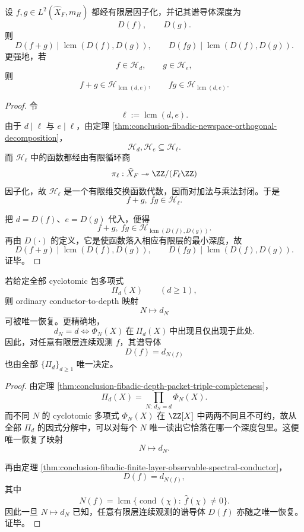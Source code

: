 \begin{theorem}\label{thm:conclusion-fibadic-finite-layer-lcm-filtration-law}
设 \(f,g\in L^2(\widehat X_F,m_H)\) 都经有限层因子化，并记其谱导体深度为
\[
D(f),\qquad D(g).
\]
则
\[
D(f+g)\mid \operatorname{lcm}(D(f),D(g)),
\qquad
D(fg)\mid \operatorname{lcm}(D(f),D(g)).
\]
更强地，若
\[
f\in \mathcal H_d,
\qquad
g\in \mathcal H_e,
\]
则
\[
f+g\in \mathcal H_{\operatorname{lcm}(d,e)},
\qquad
fg\in \mathcal H_{\operatorname{lcm}(d,e)}.
\]
\end{theorem}
\begin{proof}
令
\[
\ell:=\operatorname{lcm}(d,e).
\]
由于 \(d\mid \ell\) 与 \(e\mid \ell\)，由定理 \ref{thm:conclusion-fibadic-newspace-orthogonal-decomposition}，
\[
\mathcal H_d,\mathcal H_e\subseteq \mathcal H_\ell.
\]
而 \(\mathcal H_\ell\) 中的函数都经由有限循环商
\[
\pi_\ell:\widehat X_F\twoheadrightarrow \ZZ/(F_\ell\ZZ)
\]
因子化，故 \(\mathcal H_\ell\) 是一个有限维交换函数代数，因而对加法与乘法封闭。于是
\[
f+g,\ fg\in \mathcal H_\ell.
\]

把 \(d=D(f)\)、\(e=D(g)\) 代入，便得
\[
f+g,\ fg\in \mathcal H_{\operatorname{lcm}(D(f),D(g))}.
\]
再由 \(D(\cdot)\) 的定义，它是使函数落入相应有限层的最小深度，故
\[
D(f+g)\mid \operatorname{lcm}(D(f),D(g)),
\qquad
D(fg)\mid \operatorname{lcm}(D(f),D(g)).
\]
证毕。
\end{proof}

\begin{corollary}\label{cor:conclusion-fibadic-cyclotomic-bundles-recover-conductor-depth-map}
若给定全部 cyclotomic 包多项式
\[
\Pi_d(X)
\qquad
(d\ge 1),
\]
则 ordinary conductor-to-depth 映射
\[
N\longmapsto d_N
\]
可被唯一恢复。更精确地，
\[
d_N=d
\iff
\Phi_N(X)\ \text{在}\ \Pi_d(X)\ \text{中出现且仅出现于此处}.
\]
因此，对任意有限层连续观测 \(f\)，其谱导体
\[
D(f)=d_{N(f)}
\]
也由全部 \(\{\Pi_d\}_{d\ge 1}\) 唯一决定。
\end{corollary}
\begin{proof}
由定理 \ref{thm:conclusion-fibadic-depth-packet-triple-completeness}，
\[
\Pi_d(X)=\prod_{N:\ d_N=d}\Phi_N(X).
\]
而不同 \(N\) 的 cyclotomic 多项式 \(\Phi_N(X)\) 在 \(\ZZ[X]\) 中两两不同且不可约，故从全部 \(\Pi_d\) 的因式分解中，可以对每个 \(N\) 唯一读出它恰落在哪一个深度包里。这便唯一恢复了映射
\[
N\mapsto d_N.
\]

再由定理 \ref{thm:conclusion-fibadic-finite-layer-observable-spectral-conductor}，
\[
D(f)=d_{N(f)},
\]
其中
\[
N(f)
=
\operatorname{lcm}\{\operatorname{cond}(\chi):\ \widehat f(\chi)\neq 0\}.
\]
因此一旦 \(N\mapsto d_N\) 已知，任意有限层连续观测的谱导体 \(D(f)\) 亦随之唯一恢复。证毕。
\end{proof}
